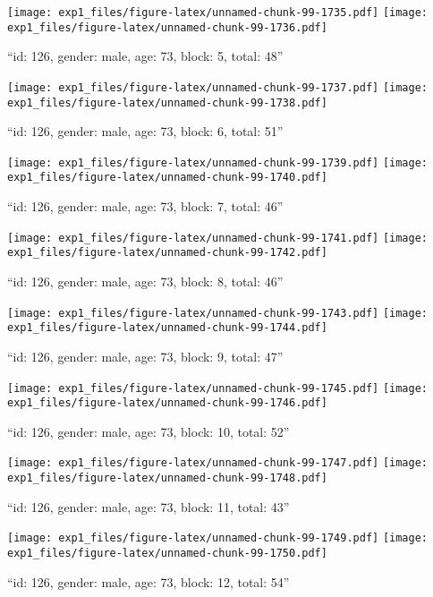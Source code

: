 \documentclass[,]{article}
\begin{document}
\texttt{[image: exp1\_files/figure-latex/unnamed-chunk-99-1735.pdf]}
\texttt{[image: exp1\_files/figure-latex/unnamed-chunk-99-1736.pdf]}

\newpage
[1] 

``id: 126, gender: male, age: 73, block: 5, total: 48''

\texttt{[image: exp1\_files/figure-latex/unnamed-chunk-99-1737.pdf]}
\texttt{[image: exp1\_files/figure-latex/unnamed-chunk-99-1738.pdf]}

\newpage
[1] 

``id: 126, gender: male, age: 73, block: 6, total: 51''

\texttt{[image: exp1\_files/figure-latex/unnamed-chunk-99-1739.pdf]}
\texttt{[image: exp1\_files/figure-latex/unnamed-chunk-99-1740.pdf]}

\newpage
[1] 

``id: 126, gender: male, age: 73, block: 7, total: 46''

\texttt{[image: exp1\_files/figure-latex/unnamed-chunk-99-1741.pdf]}
\texttt{[image: exp1\_files/figure-latex/unnamed-chunk-99-1742.pdf]}

\newpage
[1] 

``id: 126, gender: male, age: 73, block: 8, total: 46''

\texttt{[image: exp1\_files/figure-latex/unnamed-chunk-99-1743.pdf]}
\texttt{[image: exp1\_files/figure-latex/unnamed-chunk-99-1744.pdf]}

\newpage
[1] 

``id: 126, gender: male, age: 73, block: 9, total: 47''

\texttt{[image: exp1\_files/figure-latex/unnamed-chunk-99-1745.pdf]}
\texttt{[image: exp1\_files/figure-latex/unnamed-chunk-99-1746.pdf]}

\newpage
[1] 

``id: 126, gender: male, age: 73, block: 10, total: 52''

\texttt{[image: exp1\_files/figure-latex/unnamed-chunk-99-1747.pdf]}
\texttt{[image: exp1\_files/figure-latex/unnamed-chunk-99-1748.pdf]}

\newpage
[1] 

``id: 126, gender: male, age: 73, block: 11, total: 43''

\texttt{[image: exp1\_files/figure-latex/unnamed-chunk-99-1749.pdf]}
\texttt{[image: exp1\_files/figure-latex/unnamed-chunk-99-1750.pdf]}

\newpage
[1] 

``id: 126, gender: male, age: 73, block: 12, total: 54''
\end{document}
